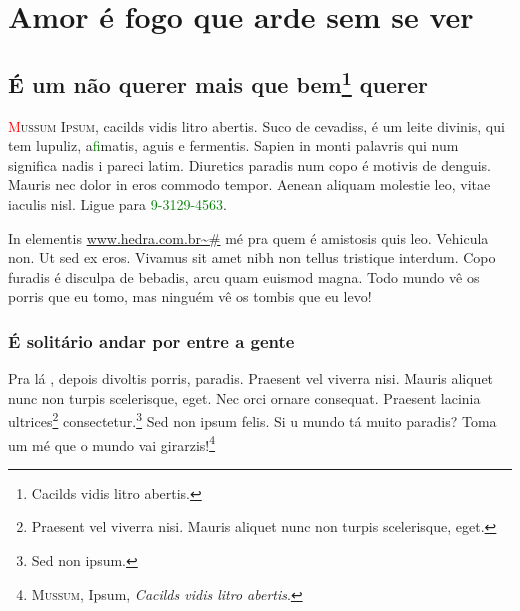 
\part{Amor é fogo que arde sem se ver}

\chapter{É um não querer mais que bem\footnote{Cacilds vidis litro abertis.} querer}

\newcommand{\pacote}[1]{\marginnote{\tiny\alltt{#1}}}


\pacote{edlab-extra}
\begin{epigraphs} 
\end{epigraphs}

\pacote{lettrine.sty}
\lettrine[realheight]{\textcolor{red}{M}}{ussum Ipsum}, cacilds vidis litro abertis. Suco de cevadiss, é um leite
divinis, qui tem lupuliz, a\textcolor{green}{fi}matis, aguis e fermentis. Sapien in monti palavris
qui num significa nadis i pareci latim.  Diuretics paradis num copo é motivis
de denguis. Mauris nec dolor in eros commodo tempor. Aenean aliquam molestie
leo, vitae iaculis nisl. Ligue para \textcolor{green}{9-3129-4563}.


In elementis \url{www.hedra.com.br\~#} mé pra quem é amistosis quis leo. Vehicula non. Ut sed ex eros.
Vivamus sit amet nibh non tellus tristique interdum. Copo furadis é disculpa de
bebadis, arcu quam euismod magna. Todo mundo vê os porris que eu tomo, mas
ninguém vê os tombis que eu levo!

\section{É solitário andar por entre a gente}


Pra lá , depois divoltis porris, paradis. Praesent vel viverra nisi. Mauris
aliquet nunc non turpis scelerisque, eget. Nec orci ornare consequat. Praesent
lacinia ultrices\footnote{Praesent vel viverra nisi. Mauris
aliquet nunc non turpis scelerisque, eget.} consectetur.\footnote{Sed non ipsum.} Sed non ipsum felis. Si u mundo tá muito paradis?
Toma um mé que o mundo vai girarzis!\footnote{\textsc{Mussum}, Ipsum,
\textit{Cacilds vidis litro abertis}.}




